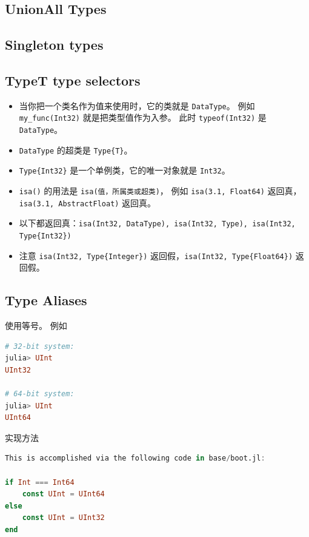 \subsection{UnionAll Types}

\subsection{Singleton types}

\subsection{Type{T} type selectors}
\begin{itemize}
\item 当你把一个类名作为值来使用时，它的类就是 \verb`DataType`。 例如 \verb`my_func(Int32)` 就是把类型值作为入参。 此时 \verb`typeof(Int32)` 是 \verb`DataType`。
\item \verb`DataType` 的超类是 \verb`Type{T}`。
\item \verb`Type{Int32}` 是一个单例类，它的唯一对象就是 \verb`Int32`。
\item \verb`isa()` 的用法是 \verb`isa(值，所属类或超类)`， 例如 \verb`isa(3.1, Float64)` 返回真，\verb`isa(3.1, AbstractFloat)` 返回真。
\item 以下都返回真：\verb`isa(Int32, DataType), isa(Int32, Type), isa(Int32, Type{Int32})` 
\item 注意 \verb`isa(Int32, Type{Integer})` 返回假，\verb`isa(Int32, Type{Float64})` 返回假。
\end{itemize}

\subsection{Type Aliases}
使用等号。 例如
\begin{lstlisting}[language=julia]
# 32-bit system:
julia> UInt
UInt32

# 64-bit system:
julia> UInt
UInt64
\end{lstlisting}
实现方法
\begin{lstlisting}[language=julia]
This is accomplished via the following code in base/boot.jl:

if Int === Int64
    const UInt = UInt64
else
    const UInt = UInt32
end
\end{lstlisting}

